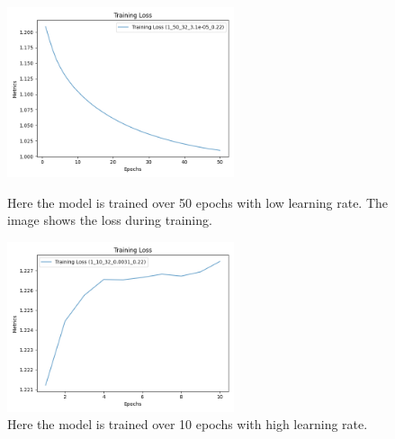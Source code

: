 \documentclass{article}
\begin{document}
\begin{figure}[H]
    \centering
    \begin{minipage}[b]{0.45\textwidth}
        \centering
        \includegraphics[width=\textwidth, height=5cm]{imgs/long_train_loss.png}
        \caption{Here the model is trained over 50 epochs with low learning rate. The image shows the loss during training.}
        \label{fig:LongTrainLoss}
    \end{minipage}
    \hfill
    \begin{minipage}[b]{0.45\textwidth}
        \centering
        \includegraphics[width=\textwidth, height=5cm]{imgs/short_train_loss.png}
        \caption{Here the model is trained over 10 epochs with high learning rate.}
        \label{fig:ShortTrainLoss}
    \end{minipage}
\end{figure}
\end{document}
